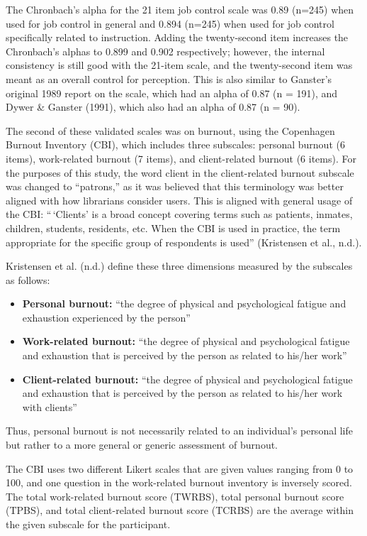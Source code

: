 \documentclass[
  twocolumn]{article}
\providecommand{\tightlist}{%
  \setlength{\itemsep}{0pt}\setlength{\parskip}{0pt}}
\begin{document}
The Chronbach's alpha for the 21 item job control scale was 0.89 (n=245)
when used for job control in general and 0.894 (n=245) when used for job
control specifically related to instruction. Adding the twenty-second
item increases the Chronbach's alphas to 0.899 and 0.902 respectively;
however, the internal consistency is still good with the 21-item scale,
and the twenty-second item was meant as an overall control for
perception. This is also similar to Ganster's original 1989 report on
the scale, which had an alpha of 0.87 (n = 191), and Dywer \& Ganster
(1991), which also had an alpha of 0.87 (n = 90).

The second of these validated scales was on burnout, using the
Copenhagen Burnout Inventory (CBI), which includes three subscales:
personal burnout (6 items), work-related burnout (7 items), and
client-related burnout (6 items). For the purposes of this study, the
word client in the client-related burnout subscale was changed to
``patrons,'' as it was believed that this terminology was better aligned
with how librarians consider users. This is aligned with general usage
of the CBI: ``\,`Clients' is a broad concept covering terms such as
patients, inmates, children, students, residents, etc. When the CBI is
used in practice, the term appropriate for the specific group of
respondents is used'' (Kristensen et al., n.d.).

Kristensen et al. (n.d.) define these three dimensions measured by the
subscales as follows:

\begin{itemize}
\tightlist
\item
  \textbf{Personal burnout:} ``the degree of physical and psychological
  fatigue and exhaustion experienced by the person''
\item
  \textbf{Work-related burnout:} ``the degree of physical and
  psychological fatigue and exhaustion that is perceived by the person
  as related to his/her work''
\item
  \textbf{Client-related burnout:} ``the degree of physical and
  psychological fatigue and exhaustion that is perceived by the person
  as related to his/her work with clients''
\end{itemize}

Thus, personal burnout is not necessarily related to an individual's
personal life but rather to a more general or generic assessment of
burnout.

The CBI uses two different Likert scales that are given values ranging
from 0 to 100, and one question in the work-related burnout inventory is
inversely scored. The total work-related burnout score (TWRBS), total
personal burnout score (TPBS), and total client-related burnout score
(TCRBS) are the average within the given subscale for the participant.
\end{document}
